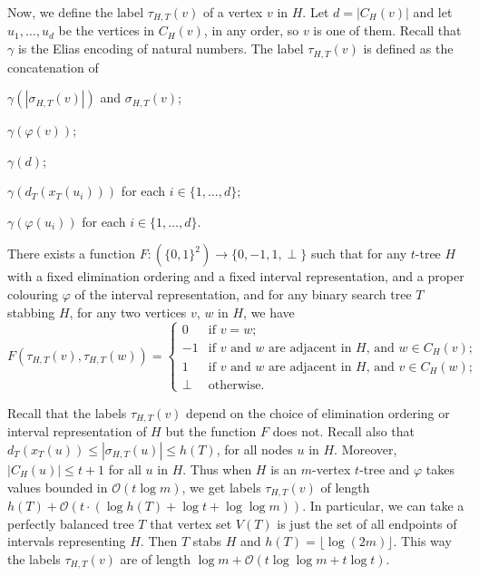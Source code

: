\documentclass[kpfonts]{patmorin}
\newcommand{\Oh}{\mathcal{O}}
\let\le\leqslant
\let\leq\leqslant
\begin{document}
Now, we define the label $\tau_{H,T}(v)$ of a vertex $v$ in $H$. 
Let $d=|C_H(v)|$ and let $u_1,\ldots, u_d$ be the vertices in $C_H(v)$, in any order, so $v$ is one of them. 
Recall that $\gamma$ is the Elias encoding of natural numbers.
The label $\tau_{H,T}(v)$ is defined 
as the concatenation of
\begin{compactenum}[(T1)]
  \item $\gamma(|\sigma_{H,T}(v)|)$ and $\sigma_{H,T}(v)$;
  \item $\gamma(\varphi(v))$;
  \item $\gamma(d)$;
  \item $\gamma(d_{T}(x_T(u_i)))$ for each $i\in\{1,\ldots,d\}$;
  \item $\gamma(\varphi(u_i))$ for each $i\in\{1,\ldots,d\}$.
  \end{compactenum}

\begin{lem}
  There exists a function $F:(\{0,1\}^2)\to\{0,-1,1,\perp\}$ such that
  for any $t$-tree $H$ 
  with a fixed elimination ordering and a fixed interval representation, 
  and a proper colouring $\varphi$ of the interval representation, and 
  for any binary search tree $T$ stabbing $H$,
  for any two vertices $v$, $w$ in $H$, we have
  \[
      F(\tau_{H,T}(v),\tau_{H,T}(w)) = \begin{cases}
      0 & \text{if $v=w$;} \\
      -1 & \text{if $v$ and $w$ are adjacent in $H$, and $w\in C_H(v)$;} \\
      1 & \text{if $v$ and $w$ are adjacent in $H$, and $v\in C_H(w)$;} \\
      \perp & \text{otherwise.}
    \end{cases}
  \]
\end{lem}
Recall that the labels $\tau_{H,T}(v)$ depend on the choice of elimination ordering or interval representation of $H$ but the function $F$ does not.
Recall also that $d_T(x_T(u)) \le |\sigma_{H,T}(u)|\leq h(T)$, for all nodes $u$ in $H$. 
Moreover, $|C_H(u)|\leq t+1$ for all $u$ in $H$. 
Thus when $H$ is an $m$-vertex $t$-tree and $\varphi$ takes values bounded in $\Oh(t\log m)$, 
we get labels $\tau_{H,T}(v)$ of length
$h(T) + \Oh(t\cdot (\log h(T) + \log t + \log\log m))$.
In particular, we can take a perfectly balanced tree $T$ that vertex set $V(T)$ is just the set of all endpoints of intervals representing $H$.
Then $T$ stabs $H$ and $h(T)=\lfloor\log(2m)\rfloor$. 
This way the labels $\tau_{H,T}(v)$ are of length $\log m + \Oh(t\log\log m +t\log t)$.
\end{document}

